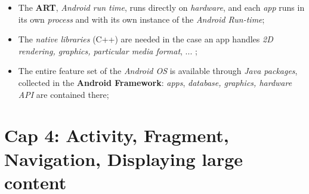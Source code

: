 \documentclass{article}
\begin{document}
\begin{itemize}
\item The \textbf{ART}, \emph{Android run time}, runs directly on \emph{hardware}, and each \emph{app} runs in its own \emph{process} and with its own instance of the \emph{Android Run-time};
\item The \emph{native libraries} (C++) are needed in the case an app handles \emph{2D rendering, graphics, particular media format}, ... ;
\item The entire feature set of the \emph{Android OS} is available through \emph{Java packages}, collected in the \textbf{Android Framework}: \emph{apps}, \emph{database, graphics, hardware API} are contained there; 
\end{itemize}

\section{Cap 4: Activity, Fragment, Navigation, Displaying large content}
\end{document}
